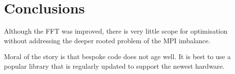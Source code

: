 \documentclass[a4paper,11pt]{report}
\begin{document}
\section{Conclusions}
Although the FFT was improved, there is very little scope for optimisation without addressing the deeper rooted problem of the MPI imbalance.
\par
Moral of the story is that bespoke code does not age well. It is best to use a popular library that is regularly updated to support the newest hardware. 






%
%
%
%




\end{document}
